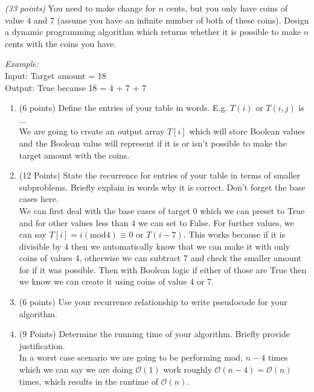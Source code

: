 \documentclass{article}
\renewcommand{\O}{\mathcal{O}}
\newcounter{ProblemCounter}
\newenvironment{problem}[1][Problem]{
 \begin{trivlist}
 \item[\hskip \labelsep {\bfseries #1}\hskip \labelsep {%
 \bfseries \theProblemCounter.%
 \stepcounter{ProblemCounter}%
 }]
}{
 \end{trivlist}
}
\begin{document}
\begin{problem}\textit{(33 points)}
You need to make change for $n$ cents, but you only have coins of value $4$ and $7$ (assume you have an infinite number of both of these coins).  Design a dynamic programming algorithm which returns whether it is possible to make $n$ cents with the coins you have.

\noindent \textit{Example:}\\
Input: Target amount = 18\\
Output: True because 18 = 4 + 7 + 7\\

\begin{enumerate}[label=\textbf{\alph*.)}]
    \item (6 points) Define the entries of your table in words. E.g. $T(i)$ or $T(i, j)$ is ...\\
    We are going to create an output array $T[i]$ which will store Boolean values and the Boolean value will represent if it is or isn't possible to make the target amount with the coins.
    \item (12 Points) State the recurrence for entries of your table in terms of smaller subproblems. Briefly explain in words why it is correct. Don't forget the base cases here.\\
    We can first deal with the base cases of target $0$ which we can preset to True and for other values less than $4$ we can set to False. For further values, we can say $T[i] = i(\text{mod} 4) \equiv 0 \text{ or } T(i-7)$. This works because if it is divisible by $4$ then we automatically know that we can make it with only coins of values 4, otherwise we can subtract 7 and check the smaller amount for if it was possible. Then with Boolean logic if either of those are True then we know we can create it using coins of value 4 or 7.
    \item (6 points) Use your recurrence relationship to write pseudocode for your algorithm.\\
    

    \item (9 Points) Determine the running time of your algorithm. Briefly provide justification.\\
    In a worst case scenario we are going to be performing mod, $n-4$ times which we can say we are doing $\O(1)$ work roughly $\O(n-4)=\O(n)$ times, which results in the runtime of $\O(n).$
\end{enumerate}
\end{problem}
\end{document}
